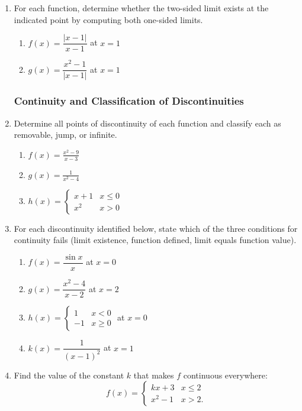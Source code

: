 \begin{enumerate}
\item For each function, determine whether the two-sided limit
      exists at the indicated point by computing both one-sided
      limits.
      \begin{enumerate}
        \item $f(x) = \dfrac{|x - 1|}{x - 1}$ at $x = 1$
        \item $g(x) = \dfrac{x^2 - 1}{|x - 1|}$ at $x = 1$
      \end{enumerate}

\subsubsection*{Continuity and Classification of Discontinuities}

\item Determine all points of discontinuity of each function
      and classify each as removable, jump, or infinite.
      \begin{enumerate}
        \item $\displaystyle f(x) = \frac{x^2 - 9}{x - 3}$
        \item $\displaystyle g(x) = \frac{1}{x^2 - 4}$
        \item $\displaystyle h(x) =
              \begin{cases} x + 1 & x \leq 0 \\ x^2 & x > 0 \end{cases}$
      \end{enumerate}

\item For each discontinuity identified below, state which of the
      three conditions for continuity fails (limit existence,
      function defined, limit equals function value).
      \begin{enumerate}
        \item $f(x) = \dfrac{\sin x}{x}$ at $x = 0$
        \item $g(x) = \dfrac{x^2 - 4}{x - 2}$ at $x = 2$
        \item $h(x) = \begin{cases} 1 & x < 0 \\ -1 & x \geq 0 \end{cases}$
              at $x = 0$
        \item $k(x) = \dfrac{1}{(x-1)^2}$ at $x = 1$
      \end{enumerate}

\item Find the value of the constant $k$ that makes $f$ continuous
      everywhere:
      \[
        f(x) =
        \begin{cases}
          kx + 3   & x \leq 2 \\
          x^2 - 1  & x > 2.
        \end{cases}
      \]


\end{enumerate}
